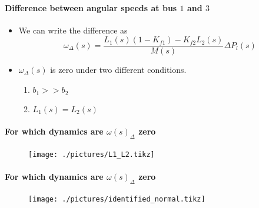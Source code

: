 \begin{frame}{\secname}
	\framesubtitle{Difference between angular speeds at bus $1$ and $3$}
	\begin{itemize}
		\item We can write the difference as
		\begin{equation}\label{eq:fdelta}
			\omega_{\Delta}(s) = \frac{L_1(s)(1-K_{f1})-K_{f2}L_2(s)}{M(s)}\Delta P_l(s)
		\end{equation}
		\item $\omega_{\Delta}(s)$ is zero under two different conditions.
		\begin{enumerate}
			\item $b_1>>b_2$
			\item $L_1(s)=L_2(s)$
		\end{enumerate}
	\end{itemize}
\end{frame}
\begin{frame}
	\framesubtitle{For which dynamics are $\omega(s)_{\Delta}$ zero}
	\begin{figure}
		\texttt{[image: ./pictures/L1\_L2.tikz]}
	\end{figure}
\end{frame}
\begin{frame}
	\framesubtitle{For which dynamics are $\omega(s)_{\Delta}$ zero}
	\begin{figure}
		\texttt{[image: ./pictures/identified\_normal.tikz]}
	\end{figure}
\end{frame}
		
		
